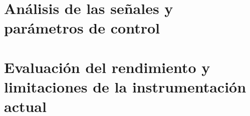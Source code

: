 

\section{Análisis de las señales y parámetros de control}
\section{Evaluación del rendimiento y limitaciones de la instrumentación actual}

